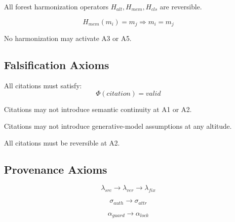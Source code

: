 \documentclass[11pt]{article}
\begin{document}
\begin{axiom}[Reversibility]
All forest harmonization operators $H_{alt}, H_{mem}, H_{cls}$ are reversible.
\end{axiom}

\begin{axiom}
\[
H_{mem}(m_i) = m_j \Rightarrow m_i = m_j
\]
\end{axiom}

\begin{axiom}
No harmonization may activate A3 or A5.
\end{axiom}

\subsection{Falsification Axioms}

\begin{axiom}[Falsifiability]
All citations must satisfy:
\[
\Phi(citation) = valid
\]
\end{axiom}

\begin{axiom}
Citations may not introduce semantic continuity at A1 or A2.
\end{axiom}

\begin{axiom}
Citations may not introduce generative-model assumptions at any altitude.
\end{axiom}

\begin{axiom}[Reversibility at A2]
All citations must be reversible at A2.
\end{axiom}

\subsection{Provenance Axioms}

\begin{axiom}[Lineage]
\[
\lambda_{src} \rightarrow \lambda_{ver} \rightarrow \lambda_{fix}
\]
\end{axiom}

\begin{axiom}[Sovereignty]
\[
\sigma_{auth} \rightarrow \sigma_{attr}
\]
\end{axiom}

\begin{axiom}
\[
\alpha_{guard} \rightarrow \alpha_{lock}
\]
\end{axiom}
\end{document}
